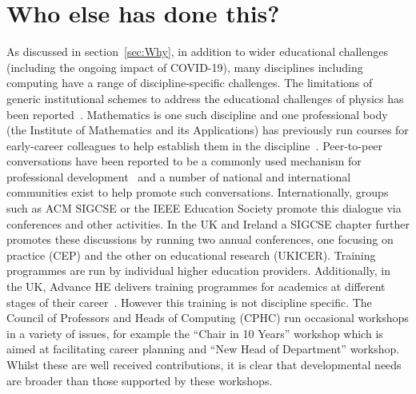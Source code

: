 \documentclass[sigconf]{acmart}
\begin{document}
\section{Who else has done this?}
As discussed in section~\ref{sec:Why}, in addition to wider
educational challenges (including the ongoing impact of COVID-19),
many disciplines including computing have a range of
discipline-specific challenges. The limitations of generic
institutional schemes to address the educational challenges of physics
has been reported~\cite{Magueijo2009}. Mathematics is one such
discipline and one professional body (the Institute of Mathematics and its
Applications) has previously run courses for early-career colleagues to help
establish them in the discipline~\cite{IMA}.
Peer-to-peer conversations have been reported to be a commonly used
mechanism for professional development~\cite{King2004} and a number of
national and international communities exist to help promote such
conversations. Internationally, groups such as ACM SIGCSE or the IEEE Education
Society promote this dialogue via conferences and other activities.
In the UK and Ireland a SIGCSE chapter further promotes these
discussions by running two annual conferences, one focusing on
practice (CEP) and the other on educational research (UKICER).
Training programmes are run by individual higher education
providers. Additionally, in the UK, Advance HE delivers training
programmes for academics at different stages of their
career~\cite{HEATraining}. However this training is not discipline
specific. The Council of Professors and Heads of Computing (CPHC) run
occasional workshops in a variety of issues, for example the ``Chair
in 10 Years'' workshop which is aimed at facilitating career planning
and ``New Head of Department'' workshop. Whilst these are well
received contributions, it is clear that developmental needs are
broader than those supported by these workshops.

\end{document}
